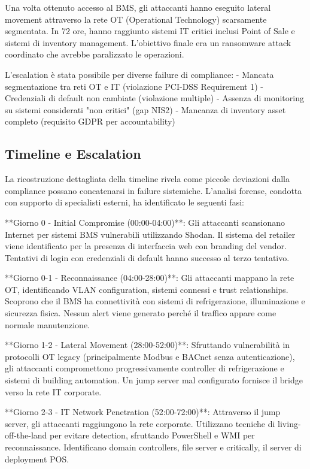 Una volta ottenuto accesso al BMS, gli attaccanti hanno eseguito lateral movement attraverso la rete OT (Operational Technology) scarsamente segmentata. In 72 ore, hanno raggiunto sistemi IT critici inclusi Point of Sale e sistemi di inventory management. L'obiettivo finale era un ransomware attack coordinato che avrebbe paralizzato le operazioni.

L'escalation è stata possibile per diverse failure di compliance:
- Mancata segmentazione tra reti OT e IT (violazione PCI-DSS Requirement 1)
- Credenziali di default non cambiate (violazione multiple)
- Assenza di monitoring su sistemi considerati "non critici" (gap NIS2)
- Mancanza di inventory asset completo (requisito GDPR per accountability)

\subsection{Timeline e Escalation}

La ricostruzione dettagliata della timeline rivela come piccole deviazioni dalla compliance possano concatenarsi in failure sistemiche. L'analisi forense, condotta con supporto di specialisti esterni, ha identificato le seguenti fasi:

**Giorno 0 - Initial Compromise (00:00-04:00)**: Gli attaccanti scansionano Internet per sistemi BMS vulnerabili utilizzando Shodan. Il sistema del retailer viene identificato per la presenza di interfaccia web con branding del vendor. Tentativi di login con credenziali di default hanno successo al terzo tentativo.

**Giorno 0-1 - Reconnaissance (04:00-28:00)**: Gli attaccanti mappano la rete OT, identificando VLAN configuration, sistemi connessi e trust relationships. Scoprono che il BMS ha connettività con sistemi di refrigerazione, illuminazione e sicurezza fisica. Nessun alert viene generato perché il traffico appare come normale manutenzione.

**Giorno 1-2 - Lateral Movement (28:00-52:00)**: Sfruttando vulnerabilità in protocolli OT legacy (principalmente Modbus e BACnet senza autenticazione), gli attaccanti compromettono progressivamente controller di refrigerazione e sistemi di building automation. Un jump server mal configurato fornisce il bridge verso la rete IT corporate.

**Giorno 2-3 - IT Network Penetration (52:00-72:00)**: Attraverso il jump server, gli attaccanti raggiungono la rete corporate. Utilizzano tecniche di living-off-the-land per evitare detection, sfruttando PowerShell e WMI per reconnaissance. Identificano domain controllers, file server e critically, il server di deployment POS.

